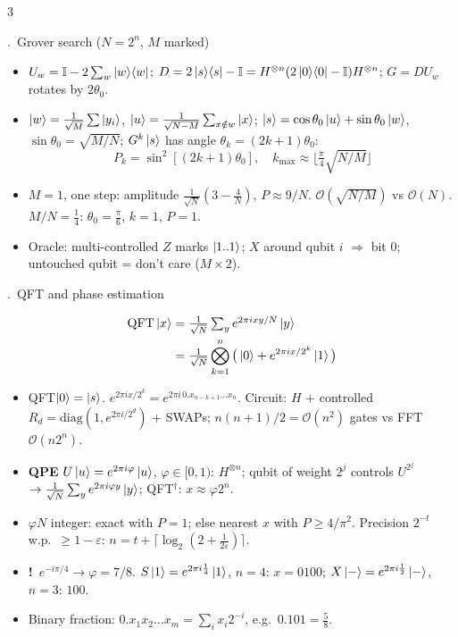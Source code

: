 \documentclass[8pt,a4paper]{extarticle}
\newcounter{sec}\newcounter{ssec}[sec]
\newcommand{\sect}[1]{\stepcounter{sec}\par\vspace{2pt}\noindent\colorbox{hd}{\parbox{\dimexpr\linewidth-2\fboxsep}{\color{white}\bfseries\strut\arabic{sec}.\ #1}}\par\vspace{0.5pt}}
\newcommand{\warn}[1]{{\color{pit}\textbf{!}~#1}}
\newcommand{\id}{\mathbb{I}}
\newcommand{\pr}[1]{\ket{#1}\!\bra{#1}}
\begin{document}
\begin{multicols}{3}
\sect{Grover search ($N=2^n$, $M$ marked)}
\begin{itemize}
\item $U_w=\id-2\sum_w\pr w$; $D=2\pr s-\id=H^{\otimes n}(2\pr0-\id)H^{\otimes n}$; $G=DU_w$ rotates by $2\theta_0$.
\item $\ket w=\frac1{\sqrt M}\sum\ket{y_i}$, $\ket u=\frac1{\sqrt{N-M}}\sum_{x\notin w}\ket x$; $\ket s=\cos\theta_0\ket u+\sin\theta_0\ket w$, $\sin\theta_0=\sqrt{M/N}$; $G^k\ket s$ has angle $\theta_k=(2k{+}1)\theta_0$:
\[P_k=\sin^2[(2k+1)\theta_0],\quad k_{\max}\approx\Big\lfloor\tfrac\pi4\sqrt{N/M}\Big\rfloor\]
\item $M=1$, one step: amplitude $\frac1{\sqrt N}(3-\frac4N)$, $P\approx9/N$. $\mathcal O(\sqrt{N/M})$ vs $\mathcal O(N)$. $M/N=\frac14$: $\theta_0=\frac\pi6$, $k=1$, $P=1$.
\item Oracle: multi-controlled $Z$ marks $\ket{1..1}$; $X$ around qubit $i$ $\Rightarrow$ bit $0$; untouched qubit = don't care ($M\times2$).
\end{itemize}

\sect{QFT and phase estimation}
\[\begin{aligned}\text{QFT}\ket x&=\tfrac1{\sqrt N}\textstyle\sum_ye^{2\pi ixy/N}\ket y\\&=\tfrac1{\sqrt N}\bigotimes_{k=1}^{n}\big(\ket0+e^{2\pi ix/2^k}\ket1\big)\end{aligned}\]
\begin{itemize}
\item QFT$\ket0=\ket s$. $e^{2\pi ix/2^k}=e^{2\pi i\,0.x_{n-k+1}\dots x_n}$. Circuit: $H$ + controlled $R_d=\mathrm{diag}(1,e^{2\pi i/2^d})$ + SWAPs; $n(n+1)/2=\mathcal O(n^2)$ gates vs FFT $\mathcal O(n2^n)$.
\item \textbf{QPE} $U\ket u=e^{2\pi i\varphi}\ket u$, $\varphi\in[0,1)$: $H^{\otimes n}$; qubit of weight $2^j$ controls $U^{2^j}$ $\to\frac1{\sqrt N}\sum_ye^{2\pi i\varphi y}\ket y$; QFT$^\dagger$: $x\approx\varphi 2^n$.
\item $\varphi N$ integer: exact with $P=1$; else nearest $x$ with $P\ge4/\pi^2$. Precision $2^{-t}$ w.p.\ $\ge1-\varepsilon$: $n=t+\lceil\log_2(2+\frac1{2\varepsilon})\rceil$.
\item \warn{$e^{-i\pi/4}\to\varphi=7/8$.} $S\ket1=e^{2\pi i\frac14}\ket1$, $n=4$: $x=0100$; $X\ket-=e^{2\pi i\frac12}\ket-$, $n=3$: $100$.
\item Binary fraction: $0.x_1x_2\dots x_m=\sum_ix_i2^{-i}$, e.g.\ $0.101=\frac58$.
\end{itemize}


\end{multicols}
\end{document}
